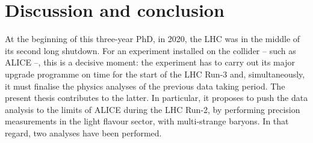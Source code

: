 \chapter{Discussion and conclusion}
\label{chap:Conclusion}

At the beginning of this three-year PhD, in 2020, the LHC was in the middle of its second long shutdown. For an experiment installed on the collider -- such as \mbox{ALICE} --, this is a decisive moment: the experiment has to carry out its major upgrade programme on time for the start of the LHC Run-3 and, simultaneously, it must finalise the physics analyses of the previous data taking period. The present thesis contributes to the latter. In particular, it proposes to push the data analysis to the limits of ALICE during the LHC Run-2, by performing precision measurements in the light flavour sector, with multi-strange baryons. In that regard, two analyses have been performed.\\


